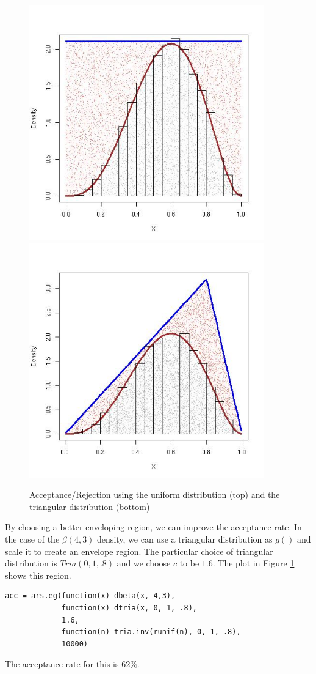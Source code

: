 \begin{figure}[htbp]
  \begin{center}
    \leavevmode
    \includegraphics[width=4in]{RNG/images/ARSBetaUnif.jpg}
\\
    \includegraphics[width=4in]{RNG/images/ARSBetaTriangular.jpg}
    \caption{Acceptance/Rejection using the uniform distribution (top)
      and the triangular distribution (bottom)}
    \label{fig:betaUnif.jpg}
  \end{center}
\end{figure}

By choosing a better enveloping region, we can improve the acceptance
rate.  In the case of the $\beta(4,3)$ density, we can use a
triangular distribution as $g()$ and scale it to create an envelope
region. The particular choice of triangular distribution is $Tria(0, 1,
.8)$ and we choose $c$ to be $1.6$.  The plot in Figure
\ref{fig:betaUnif.jpg} shows this region.
\begin{verbatim}
acc = ars.eg(function(x) dbeta(x, 4,3), 
             function(x) dtria(x, 0, 1, .8), 
             1.6, 
             function(n) tria.inv(runif(n), 0, 1, .8), 
             10000)
\end{verbatim}
The acceptance rate for this is $62\%$.

